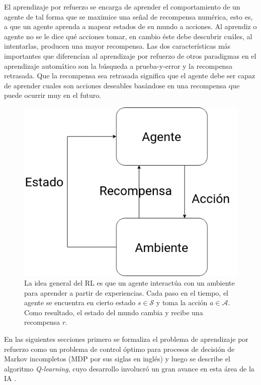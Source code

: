 El aprendizaje por refuerzo se encarga de aprender el comportamiento de un agente 
de tal forma que se maximice una señal de recompensa numérica, esto es, a que un
agente aprenda a mapear estados de su mundo a acciones. Al aprendiz o agente no se le 
dice qué acciones tomar, en cambio éste debe descubrir cuáles, al intentarlas, producen
una mayor recompensa. Las dos características más importantes que diferencían al
aprendizaje por refuerzo de otros paradigmas en el aprendizaje automático son 
la búsqueda a prueba-y-error y la recompensa retrasada. Que la recompensa sea retrasada significa que el agente debe ser 
capaz de aprender cuales son acciones deseables basándose en una recompensa que puede ocurrir muy en el futuro.

\begin{figure}[h]
    \centering
    \includegraphics[scale=0.4]{Chapter2/Figs/agend_interaction.png}
    \caption{La idea general del RL es que un agente interactúa con un ambiente para
    aprender a partir de experiencias. Cada paso en el tiempo, el agente se encuentra
    en cierto estado $s\in \mathcal{S}$ y toma la acción $a \in \mathcal{A}$. Como
    resultado, el estado del mundo cambia y recibe una recompensa $r$.}
\end{figure}

En las siguientes secciones primero se formaliza el problema de aprendizaje por refuerzo como
un problema de control óptimo para procesos de decisión de Markov incompletos (MDP por sus siglas en inglés) y luego se
describe el algoritmo \textit{Q-learning}, cuyo desarrollo involucró un gran avance en esta área de la IA  .

